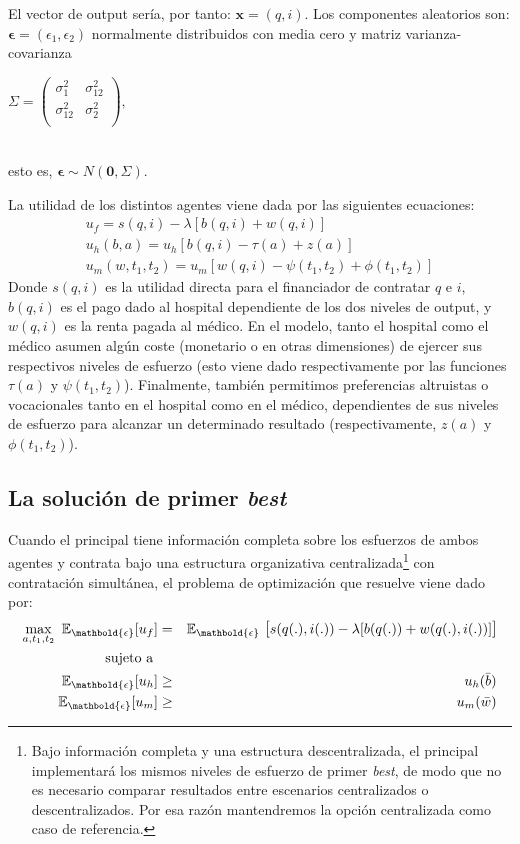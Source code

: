 ﻿\documentclass[12pt,letterpaper]{article}
\begin{document}
El vector de output ser\'ia, por tanto: $ \mathbold{x}=(q,i) $. Los componentes aleatorios son: $ \mathbold{\epsilon}=(\epsilon_1, \epsilon_2)$ normalmente distribuidos con media cero y matriz varianza-covarianza \\\centerline{$ \Sigma=\begin{pmatrix}
  \sigma^2_1 & \sigma^2_{12} \\
  \sigma^2_{12} & \sigma^2_2 \\
\end{pmatrix}, $}\\
esto es,  $ \mathbold{\epsilon}\sim N(\mathbf{0},\Sigma) $.

La utilidad de los distintos agentes viene dada por las siguientes ecuaciones:
\begin{eqnarray*}\label{util}
    u_f=s(q,i)-\lambda[b(q,i)+w(q,i)]\\
    u_h(b,a)=u_h[b(q,i)-\tau(a)+z(a)]\\
    u_m(w,t_1,t_2)=u_m[w(q,i)-\psi(t_1,t_2)+\phi(t_1,t_2)]
\end{eqnarray*}
Donde $s(q,i)$ es la utilidad directa para el financiador de contratar $q$ e $i$, $b(q,i)$ es el pago dado al hospital dependiente de los dos niveles de output, y $w(q,i)$ es la renta pagada al m\'edico. En el modelo, tanto el hospital como el m\'edico asumen alg\'un coste (monetario o en otras dimensiones) de ejercer sus respectivos niveles de esfuerzo (esto viene dado respectivamente por las funciones $\tau(a)$ y $\psi(t_1,t_2)$). Finalmente, tambi\'en permitimos preferencias altruistas o vocacionales tanto en el hospital como en el m\'edico, dependientes de sus niveles de esfuerzo para alcanzar un determinado resultado (respectivamente, $z(a)$ y $\phi(t_1,t_2)$).

\subsection{La soluci\'on de primer \emph{best}}
Cuando el principal tiene informaci\'on completa sobre los esfuerzos de ambos agentes y contrata bajo una estructura organizativa centralizada\footnote{Bajo informaci\'on completa y una estructura descentralizada, el principal implementar\'a los mismos niveles de esfuerzo de primer \emph{best}, de modo que no es necesario comparar resultados entre escenarios centralizados o descentralizados. Por esa raz\'on mantendremos la opci\'on centralizada como caso de referencia.} con contrataci\'on simult\'anea, el problema de optimizaci\'on que resuelve viene dado por:
\begin{eqnarray*}\label{maxf0}
\nonumber    \max\limits_{a,t_1,t_2}\
\mathbb{E}_{\mathbold{\epsilon}}[u_f]&=&\mathbb{E}_{\mathbold{\epsilon}}\text{\large{
[}}s(q(.),i(.))-\lambda[b(q(.))+w(q(
.),i(.))]\text{\large{]}}\\
\nonumber \text{sujeto a }\\
\mathbb{E}_{\mathbold{\epsilon}}[u_h]&\geq& u_h(\bar{b})\\
\mathbb{E}_{\mathbold{\epsilon}}[u_m]&\geq& u_m(\bar{w})
\end{eqnarray*}
\end{document}
